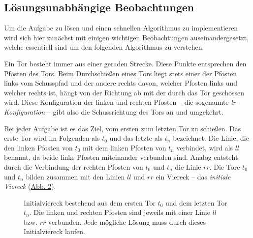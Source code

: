 \subsection{Lösungsunabhängige Beobachtungen} 
\label{sec:beobachtungen}

Um die Aufgabe zu lösen und einen schnellen Algorithmus zu implementieren wird sich hier zunächst mit einigen wichtigen Beobachtungen auseinandergesetzt, welche essentiell sind um den folgenden Algorithmus zu verstehen.

Ein Tor besteht immer aus einer geraden Strecke. Diese Punkte entsprechen den Pfosten des Tors. Beim Durchschießen eines Tors liegt stets einer der Pfosten links vom Schusspfad und der andere rechts davon, welcher Pfosten links und welcher rechts ist, hängt von der Richtung ab mit der durch das Tor geschossen wird. Diese Konfiguration der linken und rechten Pfosten – die sogenannte \emph{lr-Konfiguration} – gibt also die Schussrichtung des Tors an und umgekehrt.

Bei jeder Aufgabe ist es das Ziel, vom ersten zum letzten Tor zu schießen. Das erste Tor wird im Folgenden als \(t_0\) und das letzte als \(t_n\) bezeichnet. Die Linie, die den linken Pfosten von \(t_0\) mit dem linken Pfosten von \(t_n\) verbindet, wird als \(ll\) benannt, da beide linke Pfosten miteinander verbunden sind. Analog entsteht durch die Verbindung der rechten Pfosten von \(t_0\) und \(t_n\) die Linie \(rr\). Die Tore \(t_0\) und \(t_n\) bilden zusammen mit den Linien \(ll\) und \(rr\) ein Viereck – das \emph{initiale Viereck} (\hyperref[fig:Initialviereck]{Abb. 2}).

\begin{figure}[h]
\label{fig:Initialviereck}
\centering
{}
\caption{Initialviereck bestehend aus dem ersten Tor \(t_0\) und dem letzten Tor \(t_n\). Die linken und rechten Pfosten sind jeweils mit einer Linie \(ll\) bzw. \(rr\) verbunden. Jede mögliche Lösung muss durch dieses Initialviereck laufen.}

\end{figure}


